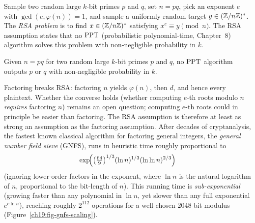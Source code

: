 \begin{definition}
\label{ch19:rsa-assumption}
Sample two random large $k$-bit primes $p$ and $q$, set $n=pq$, pick an exponent $e$ with $\gcd(e,\varphi(n))=1$, and sample a uniformly random target $y\in(\mathbb{Z}/n\mathbb{Z})^{*}$. The \emph{RSA problem} is to find $x \in (\mathbb{Z}/n\mathbb{Z})^{*}$ satisfying $x^e\equiv y\pmod n$. The RSA assumption states that no $\mathrm{PPT}$ (probabilistic polynomial-time, Chapter~8) algorithm solves this problem with non-negligible probability in $k$.
\end{definition}

\begin{definition}
\label{ch19:factoring-assumption}
Given $n=pq$ for two random large $k$-bit primes $p$ and $q$, no $\mathrm{PPT}$ algorithm outputs $p$ or $q$ with non-negligible probability in $k$.
\end{definition}

Factoring breaks RSA: factoring $n$ yields $\varphi(n)$, then $d$, and hence every plaintext. Whether the converse holds (whether computing $e$-th roots modulo $n$ \emph{requires} factoring $n$) remains an open question; computing $e$-th roots could in principle be easier than factoring. The RSA assumption is therefore at least as strong an assumption as the factoring assumption. After decades of cryptanalysis, the fastest known classical algorithm for factoring general integers, the \emph{general number field sieve} (GNFS), runs in heuristic time roughly proportional to
\[
  \exp\!\Bigl( \bigl(\tfrac{64}{9}\bigr)^{1/3} (\ln n)^{1/3}(\ln\ln n)^{2/3} \Bigr)
\]
(ignoring lower-order factors in the exponent, where $\ln n$ is the natural logarithm of $n$, proportional to the bit-length of $n$). This running time is \emph{sub-exponential} (growing faster than any polynomial in $\ln n$, yet slower than any full exponential $e^{c \ln n}$), reaching roughly $2^{112}$ operations for a well-chosen $2048$-bit modulus (Figure~\ref{ch19:fig-gnfs-scaling}).

